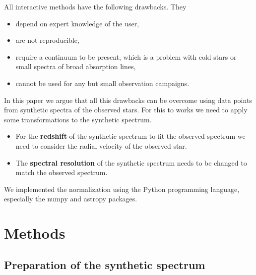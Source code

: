 \documentclass[10pt,a4paper,notitlepage,twocolumn]{article}
\begin{document}
All interactive methods have the following drawbacks. They
\begin{itemize} \itemsep -8pt
	\item depend on expert knowledge of the user,
	\item are not reproducible,
	\item require a continuum to be present, which is a problem with cold stars or small spectra of broad absorption lines,
	\item cannot be used for any but small observation campaigns.
\end{itemize}

In this paper we argue that all this drawbacks can be overcome using data points from synthetic spectra of the observed stars.
For this to works we need to apply some transformations to the synthetic spectrum.
\begin{itemize} \itemsep -8pt
	\item For the {\bf redshift} of the synthetic spectrum to fit the observed spectrum we need to consider the radial velocity of the observed star.
	\item The {\bf spectral resolution} of the synthetic spectrum needs to be changed to match the observed spectrum.
\end{itemize}

We implemented the normalization using the Python programming language, especially the numpy \cite{numpy} and astropy \cite{astropy:2013} \cite{astropy:2018} packages.

\section{Methods}

\subsection{Preparation of the synthetic spectrum}
\end{document}
